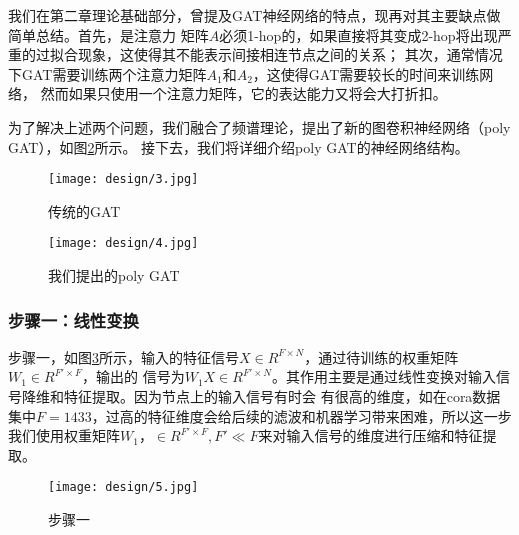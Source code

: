 我们在第二章理论基础部分，曾提及GAT神经网络的特点，现再对其主要缺点做简单总结。首先，是注意力
矩阵$A$必须1-hop的，如果直接将其变成2-hop将出现严重的过拟合现象，这使得其不能表示间接相连节点之间的关系；
其次，通常情况下GAT需要训练两个注意力矩阵$A_1$和$A_2$，这使得GAT需要较长的时间来训练网络，
然而如果只使用一个注意力矩阵，它的表达能力又将会大打折扣。

为了解决上述两个问题，我们融合了频谱理论，提出了新的图卷积神经网络（poly GAT），如图\ref{3-4}所示。
接下去，我们将详细介绍poly GAT的神经网络结构。


\begin{figure}[htbp]
    \centering
    \captionsetup{width=10cm}
    \texttt{[image: design/3.jpg]}
    \caption{\label{3-3}传统的GAT}
\end{figure}

\begin{figure}[htbp]
    \centering
    \captionsetup{width=10cm}
    \texttt{[image: design/4.jpg]}
    \caption{\label{3-4}我们提出的poly GAT}
\end{figure}

\subsubsection{步骤一：线性变换}
步骤一，如图\ref{3-5}所示，输入的特征信号$ X \in R^{F \times N} $，通过待训练的权重矩阵$ W_1 \in R^{F' \times F} $，输出的
信号为$ W_{1}X \in R^{F' \times N} $。其作用主要是通过线性变换对输入信号降维和特征提取。因为节点上的输入信号有时会
有很高的维度，如在cora数据集中$ F = 1433 $，过高的特征维度会给后续的滤波和机器学习带来困难，所以这一步
我们使用权重矩阵$ W_1，\in R^{F' \times F}, F' \ll F $来对输入信号的维度进行压缩和特征提取。
\begin{figure}[ht]
    \centering
    \texttt{[image: design/5.jpg]}
    \caption{\label{3-5}步骤一}
\end{figure}

